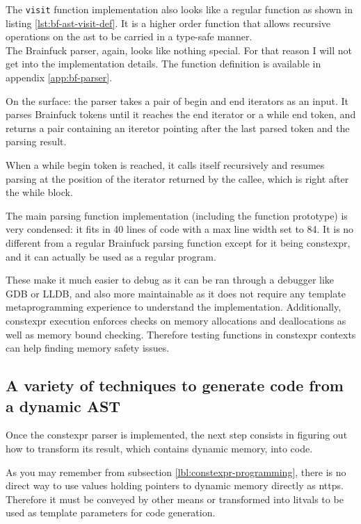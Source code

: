 \documentclass[../main]{subfiles}
\begin{document}
The \lstinline{visit} function implementation also looks like a regular \cpp
function as shown in listing \ref{lst:bf-ast-visit-def}.
It is a higher order function that allows recursive operations on the \gls{ast}
to be carried in a type-safe manner.
\\

The Brainfuck parser, again, looks like nothing special. For that reason I will
not get into the implementation details. The function definition is available
in appendix \ref{app:bf-parser}.

On the surface: the parser takes a pair of begin and end iterators as an input.
It parses Brainfuck tokens until it reaches the end iterator or a while end
token, and returns a pair containing an iteretor pointing after the last parsed
token and the parsing result.

When a while begin token is reached, it calls itself recursively and resumes
parsing at the position of the iterator returned by the callee, which is right
after the while block.

The main parsing function implementation (including the function prototype)
is very condensed: it fits in 40 lines of code with a max line width set to 84.
It is no different from a regular Brainfuck parsing function except for it being
\gls{constexpr}, and it can actually be used as a regular \cpp program.

These make it much easier to debug as it can be ran through a \cpp debugger like
GDB or LLDB, and also more maintainable as it does not require any
template metaprogramming experience to understand the implementation.
Additionally, \gls{constexpr} execution enforces checks on memory allocations and
deallocations as well as memory bound checking. Therefore testing functions
in \gls{constexpr} contexts can help finding memory safety issues.

\subsection{
  A variety of techniques to generate code from a dynamic AST
}

Once the \gls{constexpr} parser is implemented, the next step consists in
figuring out how to transform its result, which contains dynamic memory,
into \cpp code.

As you may remember from subsection \ref{lbl:constexpr-programming},
there is no direct way to use values holding pointers to dynamic memory
directly as \glspl{nttp}.
Therefore it must be conveyed by other means or transformed into \glspl{litval}
to be used as template parameters for \cpp code generation.
\end{document}
